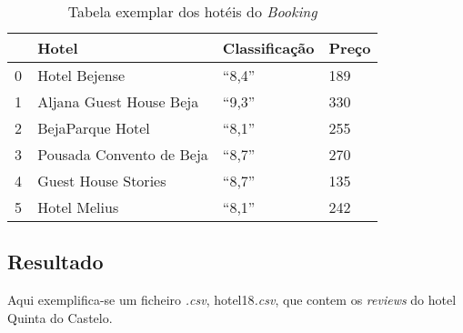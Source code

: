 \begin{table}[!ht]
  \centering
  \begin{tabular}{|l|l|l|l|}
    \hline
    ~  & Hotel                                              & Classificação & Preço \\ \hline
    0  & Hotel Bejense                                      & ``8,4''       & 189   \\ \hline
    1  & Aljana Guest House Beja                            & ``9,3''       & 330   \\ \hline
    2  & BejaParque Hotel                                   & ``8,1''       & 255   \\ \hline
    3  & Pousada Convento de Beja                           & ``8,7''       & 270   \\ \hline
    4  & Guest House Stories                                & ``8,7''       & 135   \\ \hline
    5  & Hotel Melius                                       & ``8,1''       & 242   \\ \hline
  \end{tabular}
  \caption{Tabela exemplar dos hotéis do \textit{Booking}}
  \label{table:2}
\end{table}

\subsection{Resultado}

Aqui exemplifica-se um ficheiro \textit{.csv}, hotel18\textit{.csv}, que contem os \textit{reviews} do hotel Quinta do Castelo.

